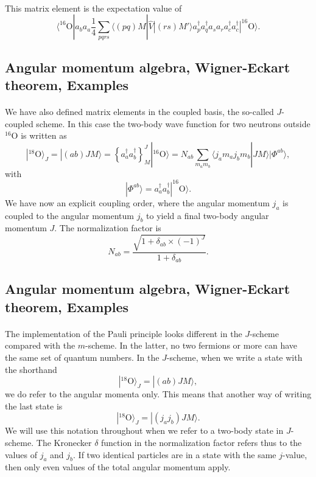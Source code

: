 \documentclass[%
twoside,                 %
final,                   %
10pt]{article}
\begin{document}
\paragraph{}
This matrix element is the expectation value of 
\[
\langle ^{16}\mathrm{O}|a_ba_a\frac{1}{4}\sum_{pqrs}\langle (pq) M | \hat{V} | (rs) M' \rangle a^{\dagger}_pa^{\dagger}_qa_sa_r a^{\dagger}_ca^{\dagger}_c|^{16}\mathrm{O}\rangle.
\]




\subsection{Angular momentum algebra, Wigner-Eckart theorem, Examples}

\paragraph{}
We have also defined matrix elements in the coupled basis, the so-called $J$-coupled scheme.
In this case the two-body wave function for two neutrons outside ${}^{16}\mbox{O}$ is written as 
\[
|^{18}\mathrm{O}\rangle_J =|(ab)JM\rangle  = \left\{a^{\dagger}_aa^{\dagger}_b\right\}^J_M|^{16}\mathrm{O}\rangle=N_{ab}\sum_{m_am_b}\langle j_am_aj_bm_b|JM\rangle|\Phi^{ab}\rangle, 
\]
with 
\[
|\Phi^{ab}\rangle=a^{\dagger}_aa^{\dagger}_b|^{16}\mathrm{O}\rangle.
\]
We have now an explicit coupling order, where the angular momentum $j_a$ is coupled to the angular momentum $j_b$ to yield a final two-body angular momentum $J$. 
The normalization factor is
\[
N_{ab}=\frac{\sqrt{1+\delta_{ab}\times (-1)^J}}{1+\delta_{ab}}.
\]




\subsection{Angular momentum algebra, Wigner-Eckart theorem, Examples}

\paragraph{}
The implementation of the Pauli principle looks different in the $J$-scheme compared with the $m$-scheme. In the latter, no two fermions or more can have the same set of quantum numbers. In the $J$-scheme, when we write a state with the shorthand 
\[
|^{18}\mathrm{O}\rangle_J =|(ab)JM\rangle,
\]
we do refer to the angular momenta only. This means that another way of writing the last state is
\[
|^{18}\mathrm{O}\rangle_J =|(j_aj_b)JM\rangle.
\]
We will use this notation throughout when we refer to a two-body state in $J$-scheme. The Kronecker $\delta$ function in the normalization factor 
refers thus to the values of $j_a$ and $j_b$. If two identical particles are in a state with the same $j$-value, then only even values of the total angular momentum apply.
\end{document}
